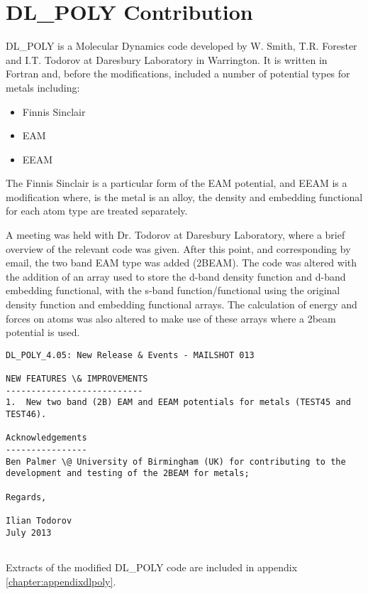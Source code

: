 
\FloatBarrier
\section{DL\_POLY Contribution}

DL\_POLY is a Molecular Dynamics code developed by W. Smith, T.R. Forester and I.T. Todorov at Daresbury Laboratory in Warrington. It is written in Fortran and, before the modifications, included a number of potential types for metals including:

\begin{itemize}
\item Finnis Sinclair
\item EAM
\item EEAM
\end{itemize}

The Finnis Sinclair is a particular form of the EAM potential, and EEAM is a modification where, is the metal is an alloy, the density and embedding functional for each atom type are treated separately.

A meeting was held with Dr. Todorov at Daresbury Laboratory, where a brief overview of the relevant code was given.  After this point, and corresponding by email, the two band EAM type was added (2BEAM).  The code was altered with the addition of an array used to store the d-band density function and d-band embedding functional, with the s-band function/functional using the original density function and embedding functional arrays.  The calculation of energy and forces on atoms was also altered to make use of these arrays where a \acrlong{2beam} potential is used.

\begin{lstlisting}[style=sEmail,caption={DL\_POLY 4.05 mailshot extract}]
DL_POLY_4.05: New Release & Events - MAILSHOT 013

NEW FEATURES \& IMPROVEMENTS
--------------------------- 
1.  New two band (2B) EAM and EEAM potentials for metals (TEST45 and TEST46). 

Acknowledgements
----------------
Ben Palmer \@ University of Birmingham (UK) for contributing to the
development and testing of the 2BEAM for metals;

Regards,

Ilian Todorov
July 2013 


\end{lstlisting}

Extracts of the modified DL\_POLY code are included in appendix \ref{chapter:appendixdlpoly}.


